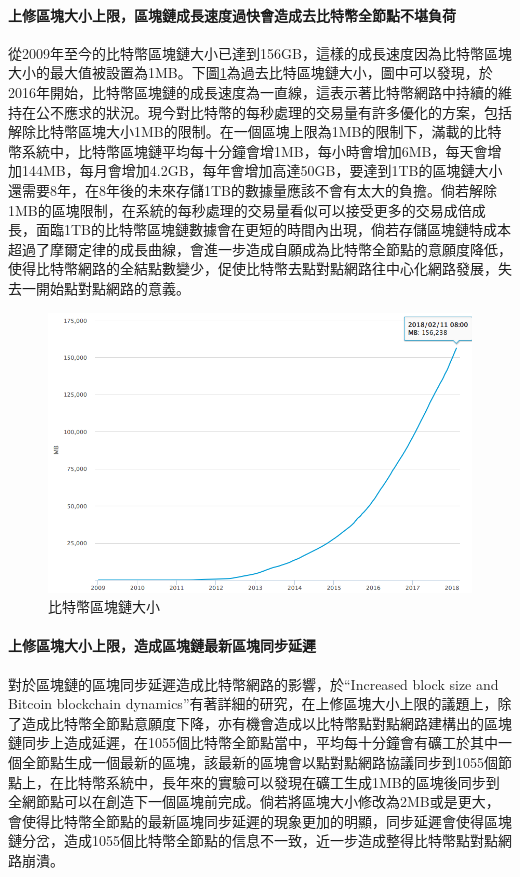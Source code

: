 			\paragraph{上修區塊大小上限，區塊鏈成長速度過快會造成去比特幣全節點不堪負荷}
			從2009年至今的比特幣區塊鏈大小已達到156GB，這樣的成長速度因為比特幣區塊大小的最大值被設置為1MB。下圖\ref{blockchainsize}為過去比特區塊鏈大小，圖中可以發現，於2016年開始，比特幣區塊鏈的成長速度為一直線，這表示著比特幣網路中持續的維持在公不應求的狀況。現今對比特幣的每秒處理的交易量有許多優化的方案，包括解除比特幣區塊大小1MB的限制。在一個區塊上限為1MB的限制下，滿載的比特幣系統中，比特幣區塊鏈平均每十分鐘會增1MB，每小時會增加6MB，每天會增加144MB，每月會增加4.2GB，每年會增加高達50GB，要達到1TB的區塊鏈大小還需要8年，在8年後的未來存儲1TB的數據量應該不會有太大的負擔。倘若解除1MB的區塊限制，在系統的每秒處理的交易量看似可以接受更多的交易成倍成長，面臨1TB的比特幣區塊鏈數據會在更短的時間內出現，倘若存儲區塊鏈特成本超過了摩爾定律的成長曲線，會進一步造成自願成為比特幣全節點的意願度降低，使得比特幣網路的全結點數變少，促使比特幣去點對點網路往中心化網路發展，失去一開始點對點網路的意義。

			\begin{figure}[h]
				\centering
				\includegraphics[width = .7\textwidth]{blockchainsize.png}
				\caption{比特幣區塊鏈大小\parencite{blockchainsize}}\label{blockchainsize}
			\end{figure}

			\paragraph{上修區塊大小上限，造成區塊鏈最新區塊同步延遲}
			對於區塊鏈的區塊同步延遲造成比特幣網路的影響，於“Increased block size and Bitcoin blockchain dynamics”\parencite{TelecommunicationNetworksandApplicationsConferenceITNAC201727thInternational}有著詳細的研究，在上修區塊大小上限的議題上，除了造成比特幣全節點意願度下降，亦有機會造成以比特幣點對點網路建構出的區塊鏈同步上造成延遲，在1055個比特幣全節點當中，平均每十分鐘會有礦工於其中一個全節點生成一個最新的區塊，該最新的區塊會以點對點網路協議同步到1055個節點上，在比特幣系統中，長年來的實驗可以發現在礦工生成1MB的區塊後同步到全網節點可以在創造下一個區塊前完成。倘若將區塊大小修改為2MB或是更大，會使得比特幣全節點的最新區塊同步延遲的現象更加的明顯，同步延遲會使得區塊鏈分岔，造成1055個比特幣全節點的信息不一致，近一步造成整得比特幣點對點網路崩潰。

